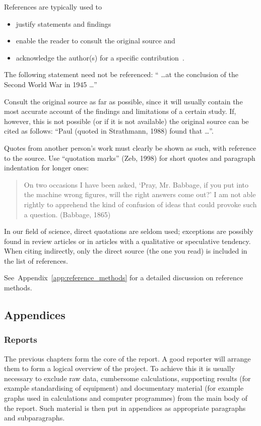 \documentclass[a5paper, 10pt]{article}
\begin{document}
References are typically used to 
\begin{itemize}
\item justify statements and findings
\item enable the reader to consult the original source and
\item acknowledge the author(s) for a specific
  contribution~\citep{burger}.
\end{itemize}

The following statement need not be referenced: `` \dots at
the conclusion of the Second World War in 1945 \dots''

Consult the original source as far as possible, since it will usually
contain the most accurate account of the findings and limitations of a
certain study.  If, however, this is not possible (or if it is not
available) the original source can be cited as follows: ``Paul (quoted
in Strathmann, 1988) found that \dots''.  

Quotes from another person's work must clearly be shown as such, with
reference to the source.  Use ``quotation marks'' (Zeb, 1998) for
short quotes and paragraph indentation for longer ones:

\begin{quote}
  On two occasions I have been asked, `Pray, Mr. Babbage, if you put
  into the machine wrong figures, will the right answers come out?' I
  am not able rightly to apprehend the kind of confusion of ideas that
  could provoke such a question. (Babbage, 1865)
\end{quote}

In our field of science, direct quotations
are seldom used; exceptions are possibly found in review articles or
in articles with a qualitative or speculative tendency.  When citing
indirectly, only the direct source (the one you read) is included in
the list of references.

See~Appendix~\ref{app:reference_methods} for a detailed discussion on
reference methods.

\subsection{Appendices}
\label{sec:appendices}
\subsubsection{Reports}
The previous chapters form the core of the report.  A good reporter
will arrange them to form a logical overview of the project.  To
achieve this it is usually necessary to exclude raw data, cumbersome
calculations, supporting results (for example standardising of
equipment) and documentary material (for example graphs used in
calculations and computer programmes) from the main body of the
report.  Such material is then put in appendices as appropriate
paragraphs and subparagraphs.
\end{document}
